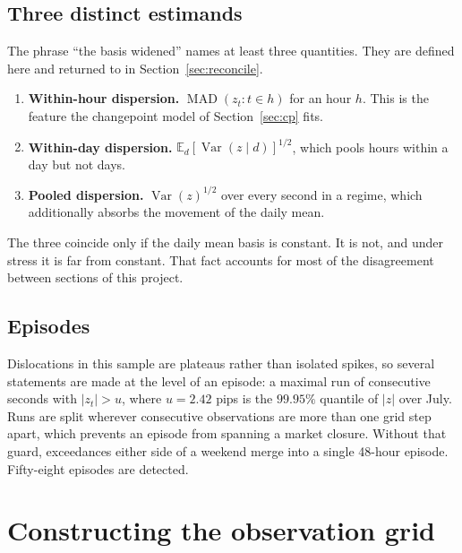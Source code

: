 \documentclass[11pt,a4paper]{article}
\begin{document}
\subsection{Three distinct estimands}

The phrase ``the basis widened'' names at least three quantities. They are defined here and
returned to in Section~\ref{sec:reconcile}.

\begin{enumerate}[leftmargin=2.2em,itemsep=6pt]
  \item \textbf{Within-hour dispersion.} $\operatorname{MAD}(z_t : t \in h)$ for an hour
  $h$. This is the feature the changepoint model of Section~\ref{sec:cp} fits.

  \item \textbf{Within-day dispersion.} $\mathbb{E}_d[\operatorname{Var}(z \mid d)]^{1/2}$,
  which pools hours within a day but not days.

  \item \textbf{Pooled dispersion.} $\operatorname{Var}(z)^{1/2}$ over every second in a
  regime, which additionally absorbs the movement of the daily mean.
\end{enumerate}

The three coincide only if the daily mean basis is constant. It is not, and under stress it
is far from constant. That fact accounts for most of the disagreement between sections of
this project.

\subsection{Episodes}

Dislocations in this sample are plateaus rather than isolated spikes, so several statements
are made at the level of an episode: a maximal run of consecutive seconds with $|z_t| > u$,
where $u = 2.42$ pips is the $99.95\%$ quantile of $|z|$ over July. Runs are split wherever
consecutive observations are more than one grid step apart, which prevents an episode from
spanning a market closure. Without that guard, exceedances either side of a weekend merge
into a single 48-hour episode. Fifty-eight episodes are detected.

\section{Constructing the observation grid}
\label{sec:grid}
\end{document}
